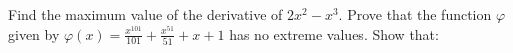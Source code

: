 \begin{questions}
\begin{multicols}{2}
    \end{multicols}
  \question Find the maximum value of the derivative of $ 2x^2 - x^3 $.
  \question Prove that the function $ \varphi $ given by $ \varphi(x) = \frac{x^{101}}{101} + \frac{x^{51}}{51} + x + 1 $ has no extreme values.
  \question Show that:
    \begin{parts}

\end{parts}
\end{questions}
